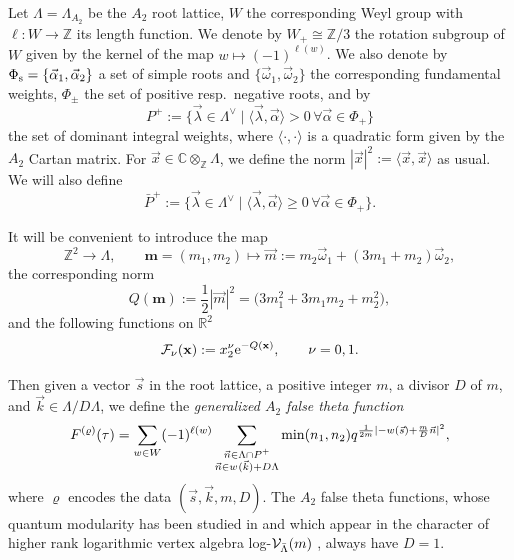 \documentclass[10pt,a4paper]{amsart}
\def\be{\begin{equation}} \def\ee{\end{equation}}
\def\BR{\mathbb{R}}
\newcommand{\ZZ}{\mathbb{Z}}
\def\bos{\varrho}
\theoremstyle{definition}
\numberwithin{equation}{section}
\begin{document}
Let $\Lambda=\Lambda_{A_2}$ be the $A_2$ root lattice, $W$ the corresponding Weyl group with $\ell\colon W \to \ZZ$ its length function. We denote by $W_+\cong \ZZ/3$ the rotation subgroup of $W$ given by the kernel of the map $w\mapsto (-1)^{\ell(w)}$. We also denote by $\Phi_{\rm s}=\{\vec \alpha_1, \vec \alpha_2\}$ a set of simple roots and $\{\vec \omega_1, \vec \omega_2\}$ the corresponding fundamental weights, $\Phi_\pm$ the set of positive resp.\ negative roots, and by
\be
\label{eqn:P+}
P^+:=\bigl\{\vec \lambda \in \Lambda^\vee
\mid \langle \vec \lambda, \vec \alpha\rangle {>} 0\, \forall \vec\alpha \in \Phi_+
\bigr\}
\ee
the set of dominant integral weights, where $\langle \cdot, \cdot \rangle$ is a quadratic form given by the $A_2$ Cartan matrix. For $\vec{x} \in \mathbb{C} \otimes_\mathbb{Z} \Lambda $, we define the norm $| \vec{x} |^2 := \langle \vec{x}, \vec{x} \rangle$ as usual. We will also define
\be
\label{eqn:barP+}
\bar P^+:=\bigl\{\vec \lambda \in \Lambda^\vee
\mid \langle \vec \lambda, \vec \alpha\rangle \geq 0 \, \forall \vec\alpha \in \Phi_+
\bigr\} .
\ee

It will be convenient to introduce the map
\[
\ZZ^2 \to \Lambda, \qquad \mathbf{m}= (m_1,m_2)\mapsto \vec {m} :=m_2 \vec\omega_1 + (3m_1+m_2)\vec \omega_2 ,
\]
the corresponding norm
\begin{equation}\label{def:quadraticformQx}
	Q(\mathbf{m}):= \frac{1}{2}|\vec { m}|^2=\bigl(3m_{1}^2+3m_1m_2+m_2^2\bigr),
\end{equation}
and the following functions on $\BR^2$
\begin{gather}\label{dfn:Fcalnu-O}
	\mathcal{F}_{\nu}( \mathbf{x} ):=x_2^\nu {\rm e}^{-Q( \mathbf{x} )}, \qquad\nu=0,1.
\end{gather}

Then given a vector $\vec s$ in the root lattice, a positive integer $m$, a divisor $D$ of $m$, and $\vec k\in \Lambda/ D\Lambda$, we define the {\em generalized $A_2$ false theta function}
\be\label{dfn:gen_false}
F^{(\bos)} (\tau) = \sum_{w\in W} (-1)^{\ell(w)} \sum_{\substack{ \vec n\in \Lambda \cap P^+\\ \vec n \in w^{}(\vec k ) + D\Lambda}} {\rm min}(n_1,n_2) q^{\frac{1}{2m} |-w(\vec s) + \frac{m}{D} \vec n|^2},
\ee
where $\bos$ encodes the data
$(\vec{s},\vec{k},m,D)$.
The $A_2$ false theta functions, whose quantum modularity has been studied in \cite{bringmann2018higher} and which appear in the character of higher rank logarithmic vertex algebra {log-${\cal V}_{\bar \Lambda}(m)$} \cite{feigin2010logarithmic}, always have $D=1$.
\end{document}

